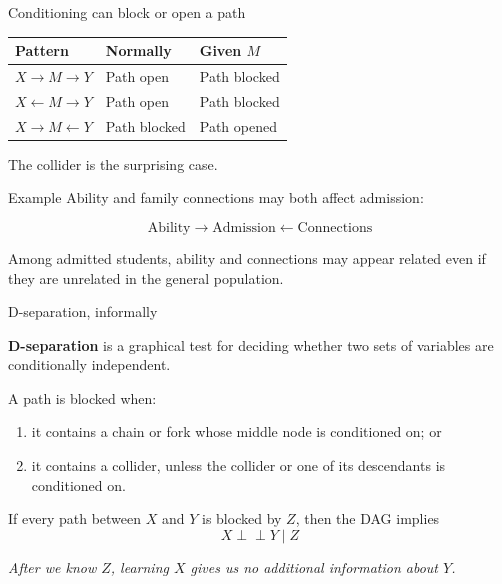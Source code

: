 \documentclass[aspectratio=43,11pt]{beamer}
\begin{document}
\begin{frame}{Conditioning can block or open a path}

\begin{table}
\centering
\begin{tabular}{lll}
\toprule
\textbf{Pattern} & \textbf{Normally} & \textbf{Given \(M\)} \\
\midrule
\(X\rightarrow M\rightarrow Y\)
  & Path open & Path blocked \\[2mm]

\(X\leftarrow M\rightarrow Y\)
  & Path open & Path blocked \\[2mm]

\(X\rightarrow M\leftarrow Y\)
  & Path blocked & Path opened \\
\bottomrule
\end{tabular}
\end{table}

\medskip

The collider is the surprising case.

\begin{exampleblock}{Example}
Ability and family connections may both affect admission:

\[
\text{Ability}
\longrightarrow
\text{Admission}
\longleftarrow
\text{Connections}
\]

Among admitted students, ability and connections may appear related even
if they are unrelated in the general population.
\end{exampleblock}

\end{frame}

\begin{frame}{D-separation, informally}

\textbf{D-separation} is a graphical test for deciding whether two sets
of variables are conditionally independent.

\medskip

A path is blocked when:

\begin{enumerate}
  \item it contains a chain or fork whose middle node is conditioned on; or
  \item it contains a collider, unless the collider or one of its
        descendants is conditioned on.
\end{enumerate}

\medskip

If every path between \(X\) and \(Y\) is blocked by \(Z\), then the DAG
implies
\[
X \perp\!\!\!\perp Y \mid Z
\]

\textit{After we know \(Z\), learning \(X\) gives us no additional information
about \(Y\).}

\end{frame}
\end{document}
